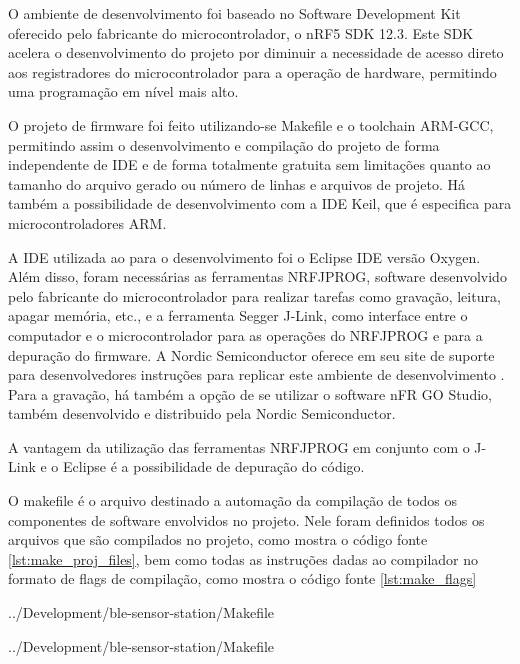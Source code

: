 O ambiente de desenvolvimento foi baseado no Software Development Kit oferecido
pelo fabricante do microcontrolador, o nRF5 SDK 12.3. Este SDK acelera o
desenvolvimento do projeto por diminuir a necessidade de acesso direto aos
registradores do microcontrolador para a operação de hardware, permitindo uma
programação em nível mais alto.
 
O projeto de firmware foi feito utilizando-se Makefile e o toolchain ARM-GCC,
permitindo assim o desenvolvimento e compilação do projeto de forma
independente de IDE e de forma totalmente gratuita sem limitações quanto ao
tamanho do arquivo gerado ou número de linhas e arquivos de projeto.
Há também a possibilidade de desenvolvimento com a
IDE Keil, que é especifica para microcontroladores ARM.

A IDE utilizada ao para o desenvolvimento foi o Eclipse IDE versão Oxygen. Além
disso, foram necessárias as ferramentas NRFJPROG, software desenvolvido pelo
fabricante do microcontrolador para realizar tarefas como gravação, leitura,
apagar memória, etc., e a ferramenta Segger J-Link, como interface entre o
computador e o microcontrolador para as operações do NRFJPROG e para a
depuração do firmware. A Nordic Semiconductor oferece em seu site de suporte para desenvolvedores 
instruções para replicar este ambiente de desenvolvimento
\cite{devzoneGccEclipse}. Para a gravação, há também a opção de se utilizar o
software nFR GO Studio, também desenvolvido e distribuido pela Nordic
Semiconductor.

A vantagem da utilização das ferramentas NRFJPROG em conjunto com o J-Link e o
Eclipse é a possibilidade de depuração do código.

O makefile é o arquivo destinado a automação da compilação de todos os
componentes de software envolvidos no projeto. Nele foram definidos todos os
arquivos que são compilados no projeto, como mostra o código fonte
\ref{lst:make_proj_files}, bem como todas as instruções dadas ao compilador no
formato de flags de compilação, como mostra o código fonte \ref{lst:make_flags}

\begin{minipage}{0.95\linewidth} 
 
{../Development/ble-sensor-station/Makefile}
\end{minipage}

\begin{minipage}{0.95\linewidth} 
 
{../Development/ble-sensor-station/Makefile}
\end{minipage}
 

